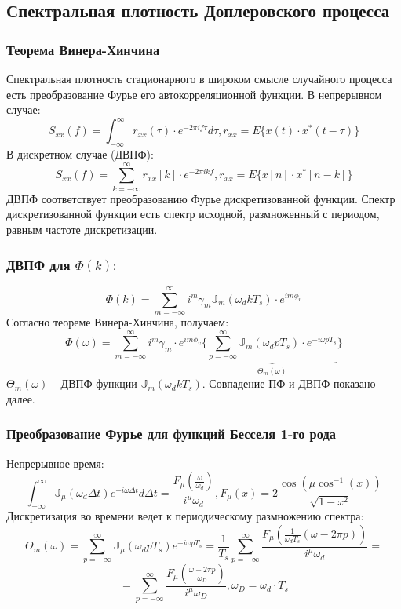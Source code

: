 \documentclass[utf8]{beamer}
\begin{document}
\subsection{Спектральная плотность Доплеровского процесса}
\begin{frame}
\frametitle{Теорема Винера-Хинчина}
Спектральная плотность стационарного в широком смысле случайного процесса есть преобразование Фурье его автокорреляционной функции.
\newline
В непрерывном случае:
$$
S_{xx}(f) = \int_{-\infty}^{\infty} r_{xx}(\tau)\cdot e^{-2\pi i f \tau}d\tau, r_{xx} = E\{x(t)\cdot x^\ast(t-\tau)\}
$$
В дискретном случае (ДВПФ):
$$
S_{xx}(f) = \sum_{k=-\infty}^{\infty} r_{xx}[k]\cdot e^{-2\pi i k f}, r_{xx} = E\{x[n]\cdot x^\ast[n-k]\}
$$
ДВПФ соответствует преобразованию Фурье дискретизованной функции. Спектр дискретизованной функции есть спектр исходной, размноженный с периодом, равным частоте дискретизации.
\end{frame}
\begin{frame}
\frametitle{ДВПФ для $\Phi(k):$}
$$
\Phi(k) = \sum_{m=-\infty}^{\infty} i^m \gamma_m \mathbb{J}_m (\omega_d k T_s)\cdot e^{im \phi_v}
$$
Согласно теореме Винера-Хинчина, получаем:
$$
\Phi(\omega) =  \sum_{m=-\infty}^{\infty}i^m\gamma_m \cdot e^{im \phi_v}\Big\{
\underbrace{\sum_{p=-\infty}^{\infty}  \mathbb{J}_m (\omega_d p T_s) \cdot e^{-i \omega p T_s}}_{\Theta_m(\omega)}
\Big\}
$$
$\Theta_m (\omega)$ -- ДВПФ функции $\mathbb{J}_m (\omega_d k T_s)$. Совпадение ПФ и ДВПФ показано далее.
\end{frame}
\begin{frame}
\frametitle{Преобразование Фурье для функций Бесселя 1-го рода}
Непрерывное время:
$$
\int_{-\infty}^{\infty} \mathbb{J}_\mu(\omega_d \Delta t)e^{-i \omega \Delta t}d\Delta t = \frac{F_\mu(\frac{\omega}{\omega_d})}{i^\mu \omega_d},
F_\mu(x) = 2\frac{\cos(\mu \cos^{-1} (x))}{\sqrt{1-x^2}}
$$
Дискретизация во времени ведет к периодическому размножению спектра:
$$
\Theta_m(\omega) = \sum_{p=-\infty}^{\infty} \mathbb{J}_\mu(\omega_d p T_s)e^{-i \omega p T_s} =
\frac{1}{T_s} \sum_{p=-\infty}^{\infty}\frac{F_\mu(\frac{1}{\omega_d T_s}(\omega - 2\pi p))}{i^\mu \omega_d} =
$$
$$
 = \sum_{p=-\infty}^{\infty}\frac{F_\mu(\frac{\omega - 2\pi p}{\omega_D})}{i^\mu \omega_D}, \omega_D = \omega_d \cdot T_s
$$
\end{frame}
\end{document}
